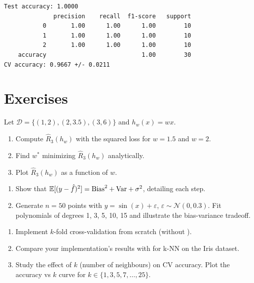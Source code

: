 \begin{codeoutput}
\begin{verbatim}
Test accuracy: 1.0000
              precision    recall  f1-score   support
           0       1.00      1.00      1.00        10
           1       1.00      1.00      1.00        10
           2       1.00      1.00      1.00        10
    accuracy                           1.00        30
CV accuracy: 0.9667 +/- 0.0211
\end{verbatim}
\end{codeoutput}

\section{Exercises}
\label{sec:exercises-ch1}

\begin{exercise}
Let $\mathcal{D} = \{(1, 2), (2, 3.5), (3, 6)\}$ and $h_w(x) = wx$.
\begin{enumerate}
  \item Compute $\hat{R}_3(h_w)$ with the squared loss for $w = 1.5$ and
    $w = 2$.
  \item Find $w^*$ minimizing $\hat{R}_3(h_w)$ analytically.
  \item Plot $\hat{R}_3(h_w)$ as a function of $w$.
\end{enumerate}
\end{exercise}

\begin{exercise}
\begin{enumerate}
  \item Show that $\mathbb{E}[(y - \hat{f})^2] = \mathrm{Bias}^2 + \mathrm{Var} + \sigma^2$,
    detailing each step.
  \item Generate $n = 50$ points with $y = \sin(x) + \varepsilon$,
    $\varepsilon \sim \mathcal{N}(0, 0.3)$. Fit polynomials of degrees
    1, 3, 5, 10, 15 and illustrate the bias-variance tradeoff.
\end{enumerate}
\end{exercise}

\begin{exercise}
\begin{enumerate}
  \item Implement $k$-fold cross-validation from scratch (without
    ).
  \item Compare your implementation's results with 
    for k-NN on the Iris dataset.
  \item Study the effect of $k$ (number of neighbours) on CV accuracy.
    Plot the accuracy vs $k$ curve for $k \in \{1, 3, 5, 7, \ldots, 25\}$.
\end{enumerate}
\end{exercise}
